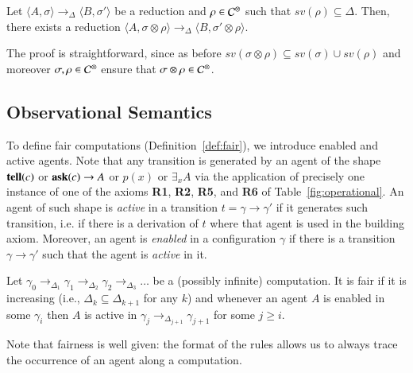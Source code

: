 \documentclass[main.tex]{subfiles}
\begin{document}
\begin{lemma}\label{opmonotonicity}
Let $\langle A, \sigma \rangle \rightarrow_\Delta \langle B, \sigma' \rangle$
be a reduction and $\rho \in  {\mathcal C}^\otimes$ such that $sv(\rho) \subseteq \Delta$. Then,
 there exists a reduction $\langle A, \sigma \otimes \rho \rangle \rightarrow_\Delta \langle B, \sigma' \otimes \rho \rangle$.
\end{lemma}

The proof is straightforward, since as before $sv(\sigma \otimes \rho) \subseteq sv(\sigma) \cup sv(\rho)$ and 
moreover $\sigma, \rho \in  {\mathcal C}^\otimes$ ensure that $\sigma \otimes \rho \in  {\mathcal C}^\otimes$.

\subsection{Observational Semantics}
To define fair computations (Definition~\ref{def:fair}), we introduce enabled and active agents.
Note that any transition is generated by an agent of the shape $\mathit{{\bf tell}}(c)$ or  $\mathit{{\bf ask}}(c) \rightarrow A$ 
or $p(x)$ or $\exists_x A$ via the application of precisely one instance of one of the axioms {\bf R1}, {\bf R2},  {\bf R5}, and {\bf R6} of Table~\ref{fig:operational}.
%
An agent of such  shape is \emph{active} in a transition $t = \gamma \rightarrow \gamma'$ if it generates such transition, i.e. if there is a derivation of $t$ where that agent is used in the building axiom.
%
Moreover, an agent is \emph{enabled} in a configuration $\gamma$ if there is a transition $\gamma \rightarrow \gamma'$ such that the agent is \emph{active} in it.

\begin{definition}\label{def:fair}
Let $\gamma_0  \rightarrow_{\Delta_1} \gamma_1  \rightarrow_{\Delta_2} \gamma_2 \rightarrow_{\Delta_3} \dots$ be a
(possibly infinite) computation. 
It is fair if it is increasing (i.e., $\Delta_k \subseteq \Delta_{k+1}$ for any $k$) and whenever an agent
$A$ is enabled in some $\gamma_i$ then $A$ is active in  $\gamma_j  \rightarrow_{\Delta_{j+1}} \gamma_{j+1}$ 
for some $j \geq i$.
\end{definition}

Note that fairness is well given: the format of the rules allows us to always trace the occurrence of an agent along a computation.
\end{document}
